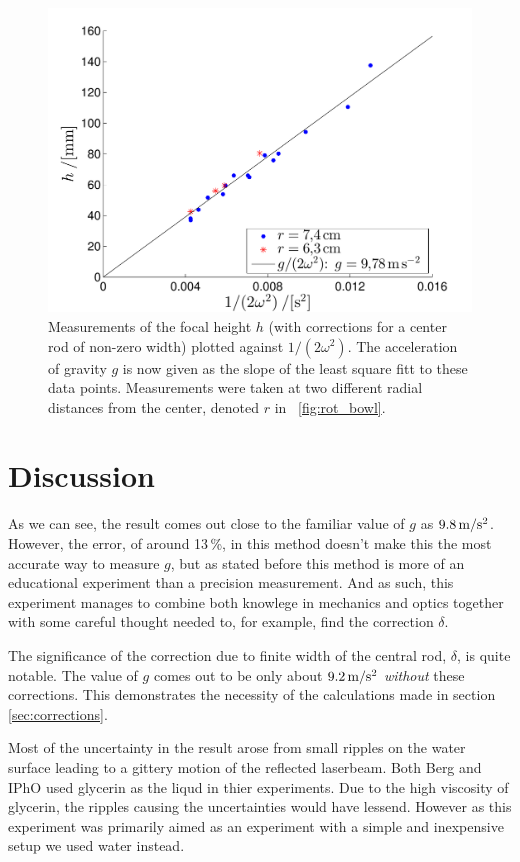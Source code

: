 \documentclass[11pt,towcolumn, swedish, english]{article}
\newcommand{\figref}{\figurename~\ref}
\begin{document}
\begin{figure}\centering 
\includegraphics[width=.6\linewidth]{g_minsta_kvadrat.pdf}
\caption{\label{fig:data} Measurements of the focal height $h$ (with
  corrections for a center rod of non-zero width) plotted against
  $1/(2\omega^2)$. The acceleration of gravity $g$ is now given as the
  slope of the least square fitt to these data points. Measurements
  were taken at two different radial distances from the center,
  denoted $r$ in \figref{fig:rot_bowl}.
}
\end{figure}


\section{Discussion}
As we can see, the result comes out close to the familiar value of $g$
as $\unit[9.8]{m/s^2}$. However, the error, of around 13\,\%, in this
method doesn't make this the most accurate way to measure $g$, but as
stated before this method is more of an educational experiment than a
precision measurement. And as such, this experiment manages to combine
both knowlege in mechanics and optics together with some careful
thought needed to, for example, find the correction $\delta$.

The significance of the correction due to finite width of the central
rod, $\delta$, is quite notable. The value of $g$ comes out to be only
about $\unit[9.2]{m/s^2}$ \emph{without} these corrections. This
demonstrates the necessity of the calculations made in section
\ref{sec:corrections}. 

Most of the uncertainty in the result arose from small ripples on the
water surface leading to a gittery motion of the reflected
laserbeam. Both Berg\cite{Berg1990} and IPhO\cite{IPhO2001} used
glycerin as the liqud in thier experiments. Due to the high viscosity
of glycerin, the ripples causing the uncertainties would have lessend.
However as this experiment was primarily aimed as an experiment with a
simple and inexpensive setup we used water instead.  
\end{document}
